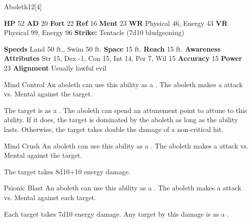 \begin{monsection}{Aboleth}{12}[4]
    \begin{spellcontent}
      \begin{spelltargetinginfo}
        \pari \textbf{HP} 52 \monsep
          \textbf{AD} 20 \monsep
          \textbf{Fort} 22 \monsep
          \textbf{Ref} 16 \monsep
          \textbf{Ment} 23
        \pari \textbf{WR} Physical 46, Energy 43 \monsep
        \textbf{VR} Physical 99, Energy 96
        \pari \textbf{Strike:}
            Tentacle  (7d10 bludgeoning)
      \end{spelltargetinginfo}
    \end{spellcontent}
    \begin{monsterfooter}
      \pari \textbf{Speeds} Land 50 ft., Swim 50 ft. \monsep
        \textbf{Space} 15 ft. \monsep
        \textbf{Reach} 15 ft.
      \pari \textbf{Awareness} 
      \pari \textbf{Attributes}
        Str 15, Dex -1,
        Con 15, Int 14,
        Per 7, Wil 15
      \pari \textbf{Accuracy} 15 \monsep
        \textbf{Power} 23
      \pari \textbf{Alignment} Usually lawful evil
    \end{monsterfooter}
  \end{monsection}
  \begin{freeability}{Mind Control}
      An aboleth can use this ability as a . The aboleth makes a  attack
        vs. Mental against the target.
    
    \hit The target is  as a .
    \crit 
        The aboleth can spend an attunement point to attune to this ability.
        If it does, the target is dominated by the aboleth as long as the ability lasts.
        Otherwise, the target takes double the damage of a non-critical hit.
    \end{freeability}
  

    \begin{freeability}{Mind Crush}
      An aboleth can use this ability as a . The aboleth makes a  attack
        vs. Mental against the target.
    
    \hit The target takes 8d10+10 energy damage.
    \end{freeability}
  

    \begin{freeability}{Psionic Blast}
      An aboleth can use this ability as a . The aboleth makes a  attack
        vs. Mental against each target.
    
    \hit Each target takes 7d10 energy damage. Any target  by this damage is  as a .
    \end{freeability}
  

